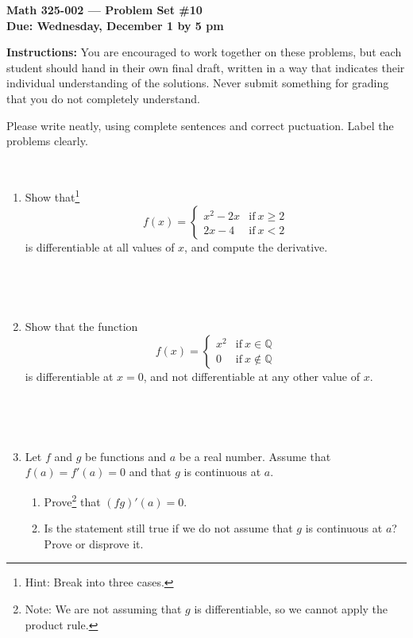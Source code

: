 \documentclass{amsart}
\def\Q{\mathbb Q}
\begin{document}
\begin{center}
{\large\bfseries
Math 325-002 --- Problem Set \#10\\
Due: Wednesday, December 1 by 5 pm}
\end{center}





{\bf Instructions:} You are encouraged to work together on these
problems, but each student should hand in their own final draft,
written in a way that indicates their individual understanding of
the solutions. Never submit something for grading
that you do not completely understand. 

Please write neatly, using complete sentences and correct
puctuation. Label the problems clearly. 


\



\begin{enumerate}


\item Show that\footnote{Hint: Break into three cases.}
\[ f(x) = \begin{cases} x^2-2x& \text{if} \ x\geq 2 \\ 2x-4 &\text{if} \ x<2 \end{cases}\]
is differentiable at all values of $x$, and compute the derivative.

\

\

\item Show that the function 
\[ f(x) = \begin{cases} x^2  & \text{if} \ x\in \Q \\ 0&\text{if} \ x\notin \Q \end{cases}\]
is differentiable at $x=0$, and not differentiable at any other value of $x$.

\

\

\item Let $f$ and $g$ be functions and $a$ be a real number. Assume that $f(a) = f'(a) = 0$ and that $g$ is continuous at $a$. 
\begin{enumerate}
\item Prove\footnote{Note: We are not assuming that $g$ is differentiable, so we cannot apply the product rule.} that $(fg)'(a) = 0$.
\item Is the statement still true if we do not assume that $g$ is continuous at $a$? Prove or disprove it.

\end{enumerate}
\end{enumerate}
\end{document}
